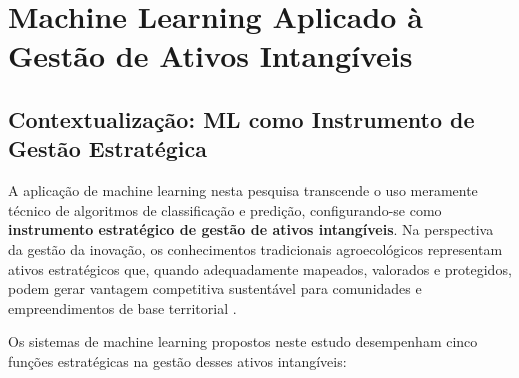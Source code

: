 \section{Machine Learning Aplicado à Gestão de Ativos Intangíveis}

\subsection{Contextualização: ML como Instrumento de Gestão Estratégica}

A aplicação de machine learning nesta pesquisa transcende o uso meramente técnico de algoritmos de classificação e predição, configurando-se como \textbf{instrumento estratégico de gestão de ativos intangíveis}. Na perspectiva da gestão da inovação, os conhecimentos tradicionais agroecológicos representam ativos estratégicos que, quando adequadamente mapeados, valorados e protegidos, podem gerar vantagem competitiva sustentável para comunidades e empreendimentos de base territorial \cite{Barney1991}.

Os sistemas de machine learning propostos neste estudo desempenham cinco funções estratégicas na gestão desses ativos intangíveis:

